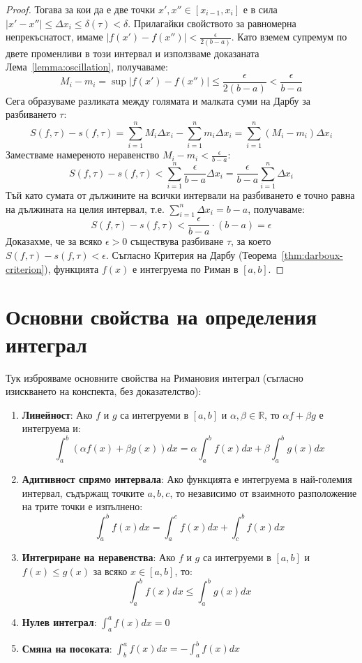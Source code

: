 \documentclass{scrartcl}
\begin{document}
\begin{FlushLeft}
\begin{proof}
Тогава за кои да е две точки $x', x'' \in [x_{i-1}, x_i]$ е в сила $|x' - x''| \le \Delta x_i \le \delta(\tau) < \delta$. Прилагайки свойството за равномерна непрекъснатост, имаме $|f(x') - f(x'')| < \frac{\epsilon}{2(b-a)}$. Като вземем супремум по двете променливи в този интервал и използваме доказаната Лема~\ref{lemma:oscillation}, получаваме:
\[ M_i - m_i = \sup |f(x') - f(x'')| \le \frac{\epsilon}{2(b-a)} < \frac{\epsilon}{b-a} \]
Сега образуваме разликата между голямата и малката суми на Дарбу за разбиването $\tau$:
\[ S(f, \tau) - s(f, \tau) = \sum_{i=1}^n M_i \Delta x_i - \sum_{i=1}^n m_i \Delta x_i = \sum_{i=1}^n (M_i - m_i)\Delta x_i \]
Заместваме намереното неравенство $M_i - m_i < \frac{\epsilon}{b-a}$:
\[ S(f, \tau) - s(f, \tau) < \sum_{i=1}^n \frac{\epsilon}{b-a} \Delta x_i = \frac{\epsilon}{b-a} \sum_{i=1}^n \Delta x_i \]
Тъй като сумата от дължините на всички интервали на разбиването е точно равна на дължината на целия интервал, т.е. $\sum_{i=1}^n \Delta x_i = b - a$, получаваме:
\[ S(f, \tau) - s(f, \tau) < \frac{\epsilon}{b-a} \cdot (b - a) = \epsilon \]
Доказахме, че за всяко $\epsilon > 0$ съществува разбиване $\tau$, за което $S(f, \tau) - s(f, \tau) < \epsilon$. Съгласно Критерия на Дарбу (Теорема~\ref{thm:darboux-criterion}), функцията $f(x)$ е интегруема по Риман в $[a, b]$.
\end{proof}

\section{Основни свойства на определения интеграл}

Тук изброяваме основните свойства на Римановия интеграл (съгласно изискването на конспекта, без доказателство):
\begin{enumerate}
    \item \textbf{Линейност}: Ако $f$ и $g$ са интегруеми в $[a, b]$ и $\alpha, \beta \in \mathbb{R}$, то $\alpha f + \beta g$ е интегруема и:
    \[ \int_a^b (\alpha f(x) + \beta g(x))dx = \alpha \int_a^b f(x)dx + \beta \int_a^b g(x)dx \]
    \item \textbf{Адитивност спрямо интервала}: Ако функцията е интегруема в най-големия интервал, съдържащ точките $a, b, c$, то независимо от взаимното разположение на трите точки е изпълнено:
    \[ \int_a^b f(x)dx = \int_a^c f(x)dx + \int_c^b f(x)dx \]
    \item \textbf{Интегриране на неравенства}: Ако $f$ и $g$ са интегруеми в $[a, b]$ и $f(x) \le g(x)$ за всяко $x \in [a, b]$, то:
    \[ \int_a^b f(x)dx \le \int_a^b g(x)dx \]
    \item \textbf{Нулев интеграл}: $\int_a^a f(x)dx = 0$
    \item \textbf{Смяна на посоката}: $\int_b^a f(x)dx = -\int_a^b f(x)dx$
\end{enumerate}


\end{FlushLeft}
\end{document}
